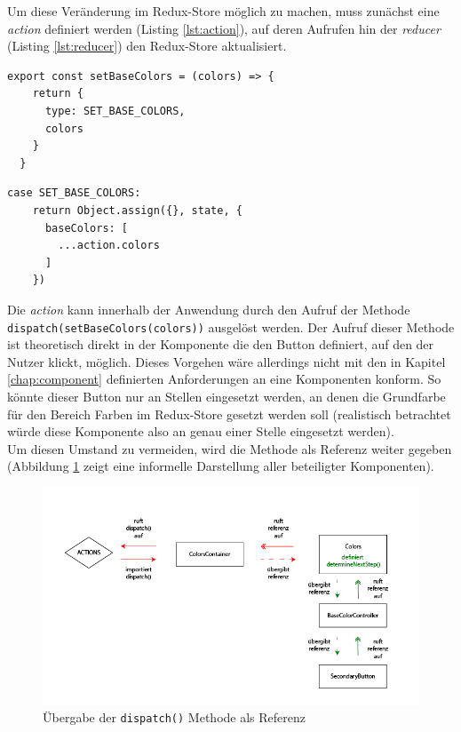 Um diese Veränderung im Redux-Store möglich zu machen, muss zunächst eine \textit{action} definiert werden (Listing \ref{lst:action}), auf deren Aufrufen hin der \textit{reducer} (Listing \ref{lst:reducer}) den Redux-Store aktualisiert.


\begin{lstlisting}[caption={Definition der \textit{action} zum setzen der Grundfarben}, label=lst:action]
  export const setBaseColors = (colors) => {
    return {
      type: SET_BASE_COLORS,
      colors
    }
  }
\end{lstlisting}

\begin{lstlisting}[caption={Veränderung des Redux-Store beim Aufrauf der \textit{action} \texttt{setBaseColors}}, label=lst:reducer]
  case SET_BASE_COLORS:
    return Object.assign({}, state, {
      baseColors: [
        ...action.colors
      ]
    })
\end{lstlisting}

Die \textit{action} kann innerhalb der Anwendung durch den Aufruf der Methode \verb|dispatch(setBaseColors(colors))| ausgelöst werden. Der Aufruf dieser Methode ist theoretisch direkt in der Komponente die den Button definiert, auf den der Nutzer klickt, möglich. Dieses Vorgehen wäre allerdings nicht mit den in Kapitel \ref{chap:component} definierten Anforderungen an eine Komponenten konform. So könnte dieser Button nur an Stellen eingesetzt werden, an denen die Grundfarbe für den Bereich Farben im Redux-Store gesetzt werden soll (realistisch betrachtet würde diese Komponente also an genau einer Stelle eingesetzt werden).\\
Um diesen Umstand zu vermeiden, wird die Methode als Referenz weiter gegeben (Abbildung \ref{fig:redux_flow} zeigt eine informelle Darstellung aller beteiligter Komponenten).

\begin{figure}[h]
    \centering
    \includegraphics[width=1\textwidth]{images/redux_store_flow.png}
    \caption{Übergabe der \texttt{dispatch()} Methode als Referenz}
    \label{fig:redux_flow}
\end{figure}

